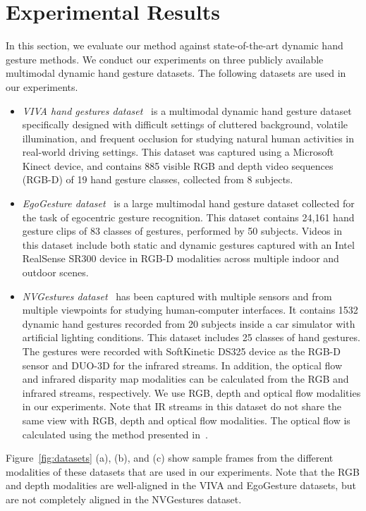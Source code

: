 \documentclass[10pt,twocolumn,letterpaper]{article}
\begin{document}
\section{Experimental Results}\label{sec:result}
In this section, we evaluate our method against state-of-the-art dynamic hand gesture methods.  We conduct our experiments on three publicly available multimodal dynamic hand gesture datasets.  The following datasets are used in our experiments.
\begin{itemize}[noitemsep,topsep=0pt]
    \item \emph{VIVA hand gestures dataset}~\cite{ohn2014hand} is a multimodal dynamic hand gesture dataset specifically designed with difficult settings of cluttered background, volatile illumination, and frequent occlusion for studying natural human activities in real-world driving settings.   This dataset was captured using a Microsoft Kinect device, and contains 885 visible RGB and depth video sequences  (RGB-D) of 19 hand gesture classes, collected from 8 subjects.
    \item \emph{EgoGesture dataset}~\cite{cao2017egocentric,zhang2018egogesture} is a large multimodal hand gesture dataset collected for the task of egocentric gesture recognition.  This dataset contains 24,161 hand gesture clips of 83 classes of gestures, performed by 50 subjects.   Videos in this dataset include both static and dynamic gestures captured with an Intel RealSense SR300 device in RGB-D modalities across multiple indoor and outdoor scenes.
    \item \emph{NVGestures dataset}~\cite{molchanov2016online} has been captured with multiple sensors and from multiple viewpoints for studying human-computer interfaces. It contains 1532 dynamic hand gestures recorded from 20 subjects inside a car simulator with artificial lighting conditions.   This dataset includes 25 classes of hand gestures.  The gestures were recorded with SoftKinetic DS325 device as the RGB-D sensor and DUO-3D for the infrared streams.  In addition, the optical flow and infrared disparity map modalities can be calculated from the RGB and infrared streams, respectively.    We use RGB, depth and optical flow modalities in our experiments.  Note that IR streams in this dataset do not share the same view with RGB, depth and optical flow modalities. The optical flow is calculated using the method presented in~\cite{farneback2003two}. 
\end{itemize}



Figure~\ref{fig:datasets} (a), (b), and (c) show sample frames from  the different modalities of these datasets that are used in our experiments.  Note that the RGB and depth modalities are well-aligned in the VIVA and EgoGesture datasets, but are not completely aligned in the NVGestures dataset.
\end{document}
